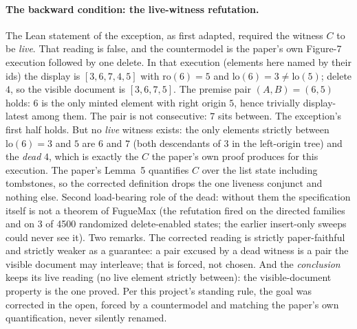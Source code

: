 \documentclass[11pt]{article}
\begin{document}
\paragraph{The backward condition: the live-witness refutation.} The
Lean statement of the exception, as first adapted, required the witness
$C$ to be \emph{live}. That reading is false, and the countermodel is
the paper's own Figure-7 execution followed by one delete. In that
execution (elements here named by their ids) the display is
$[3, 6, 7, 4, 5]$ with $\mathrm{ro}(6) = 5$ and
$\mathrm{lo}(6) = 3 \ne \mathrm{lo}(5)$; delete $4$, so the visible
document is $[3, 6, 7, 5]$. The premise pair $(A, B) = (6, 5)$ holds:
$6$ is the only minted element with right origin $5$, hence trivially
display-latest among them. The pair is not consecutive: $7$ sits
between. The exception's first half holds. But no \emph{live} witness
exists: the only elements strictly between $\mathrm{lo}(6) = 3$ and $5$
are $6$ and $7$ (both descendants of $3$ in the left-origin tree) and
the \emph{dead} $4$, which is exactly the $C$ the paper's own proof
produces for this execution. The paper's Lemma~5 quantifies $C$ over
the list state including tombstones, so the corrected definition drops
the one liveness conjunct and nothing else. Second load-bearing role of
the dead: without them the specification itself is not a theorem of
FugueMax (the refutation fired on the directed families and on 3 of
4500 randomized delete-enabled states; the earlier insert-only sweeps
could never see it). Two remarks. The corrected reading is strictly
paper-faithful and strictly weaker as a guarantee: a pair excused by a
dead witness is a pair the visible document may interleave; that is
forced, not chosen. And the \emph{conclusion} keeps its live reading
(no live element strictly between): the visible-document property is
the one proved. Per this project's standing rule, the goal was
corrected in the open, forced by a countermodel and matching the
paper's own quantification, never silently renamed.
\end{document}
